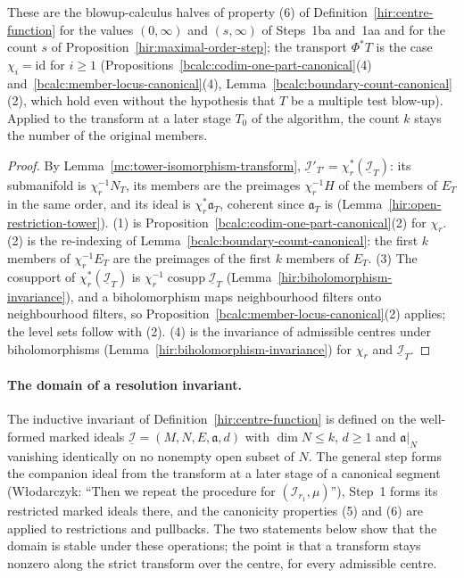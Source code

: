 \begin{proposition}
\begin{enumerate}
\end{enumerate}
These are the blowup-calculus halves of property (6) of Definition~\ref{hir:centre-function} for the values \((0,\infty)\) and \((s,\infty)\) of Steps~1ba and~1aa and for
the count \(s\) of Proposition~\ref{hir:maximal-order-step}; the transport \(\Phi^*T\) is the case \(\chi_i=\mathrm{id}\) for \(i\ge1\)
(Propositions~\ref{bcalc:codim-one-part-canonical}(4) and~\ref{bcalc:member-locus-canonical}(4), Lemma~\ref{bcalc:boundary-count-canonical}(2), which hold even without the
hypothesis that \(T\) be a multiple test blow-up). Applied to the transform at a later stage \(T_0\) of the algorithm, the count \(k\) stays the number of the original members.
\end{proposition}
\begin{proof}
\upstreamleanok
By Lemma~\ref{mc:tower-isomorphism-transform}, \(\underline{\mathcal I}'_{T'}=\chi_r^*(\underline{\mathcal I}_T)\): its submanifold is \(\chi_r^{-1}N_T\), its members are the preimages
\(\chi_r^{-1}H\) of the members of \(E_T\) in the same order, and its ideal is \(\chi_r^*\mathfrak a_T\), coherent since \(\mathfrak a_T\) is (Lemma~\ref{hir:open-restriction-tower}).
(1) is Proposition~\ref{bcalc:codim-one-part-canonical}(2) for \(\chi_r\). (2) is the re-indexing of Lemma~\ref{bcalc:boundary-count-canonical}: the first \(k\) members of
\(\chi_r^{-1}E_T\) are the preimages of the first \(k\) members of \(E_T\). (3) The cosupport of \(\chi_r^*(\underline{\mathcal I}_T)\) is \(\chi_r^{-1}\operatorname{cosupp}\underline{\mathcal I}_T\)
(Lemma~\ref{hir:biholomorphism-invariance}), and a biholomorphism maps neighbourhood filters onto neighbourhood filters, so Proposition~\ref{bcalc:member-locus-canonical}(2) applies;
the level sets follow with (2). (4) is the invariance of admissible centres under biholomorphisms (Lemma~\ref{hir:biholomorphism-invariance}) for \(\chi_r\) and
\(\underline{\mathcal I}_T\).
\end{proof}

\paragraph{The domain of a resolution invariant.} The inductive invariant of Definition~\ref{hir:centre-function} is defined on the well-formed marked
ideals \(\underline{\mathcal I}=(M,N,E,\mathfrak a,d)\) with \(\dim N\le k\), \(d\ge1\) and \(\mathfrak a|_N\) vanishing identically on no nonempty open subset of \(N\). The
general step forms the companion ideal from the transform at a later stage of a canonical segment (Włodarczyk: ``Then we repeat the procedure for
\(({\mathcal I}_{r_1},\mu)\)''), Step~1 forms its restricted marked ideals there, and the canonicity properties (5) and (6) are applied to restrictions and
pullbacks. The two statements below show that the domain is stable under these operations; the point is that a transform stays nonzero along the
strict transform over the centre, for every admissible centre.


